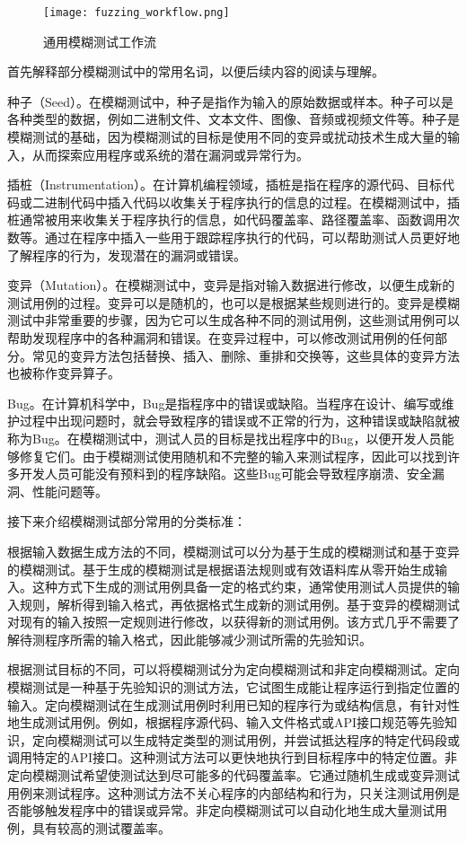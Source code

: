 \documentclass[master]{thesis-uestc}
\begin{document}
\begin{figure}[!htbp]
    \vspace{6pt}
    \centering
    \texttt{[image: fuzzing\_workflow.png]}
    \caption{通用模糊测试工作流}
    \label{fuzzing_workflow}
\end{figure}

首先解释部分模糊测试中的常用名词，以便后续内容的阅读与理解。

种子（Seed）。在模糊测试中，种子是指作为输入的原始数据或样本。种子可以是各种类型的数据，例如二进制文件、文本文件、图像、音频或视频文件等。种子是模糊测试的基础，因为模糊测试的目标是使用不同的变异或扰动技术生成大量的输入，从而探索应用程序或系统的潜在漏洞或异常行为。

插桩（Instrumentation）。在计算机编程领域，插桩是指在程序的源代码、目标代码或二进制代码中插入代码以收集关于程序执行的信息的过程。在模糊测试中，插桩通常被用来收集关于程序执行的信息，如代码覆盖率、路径覆盖率、函数调用次数等。通过在程序中插入一些用于跟踪程序执行的代码，可以帮助测试人员更好地了解程序的行为，发现潜在的漏洞或错误。

变异（Mutation）。在模糊测试中，变异是指对输入数据进行修改，以便生成新的测试用例的过程。变异可以是随机的，也可以是根据某些规则进行的。变异是模糊测试中非常重要的步骤，因为它可以生成各种不同的测试用例，这些测试用例可以帮助发现程序中的各种漏洞和错误。在变异过程中，可以修改测试用例的任何部分。常见的变异方法包括替换、插入、删除、重排和交换等，这些具体的变异方法也被称作变异算子。

Bug。在计算机科学中，Bug是指程序中的错误或缺陷。当程序在设计、编写或维护过程中出现问题时，就会导致程序的错误或不正常的行为，这种错误或缺陷就被称为Bug。在模糊测试中，测试人员的目标是找出程序中的Bug，以便开发人员能够修复它们。由于模糊测试使用随机和不完整的输入来测试程序，因此可以找到许多开发人员可能没有预料到的程序缺陷。这些Bug可能会导致程序崩溃、安全漏洞、性能问题等。

接下来介绍模糊测试部分常用的分类标准：

根据输入数据生成方法的不同，模糊测试可以分为基于生成的模糊测试和基于变异的模糊测试。基于生成的模糊测试是根据语法规则或有效语料库从零开始生成输入。这种方式下生成的测试用例具备一定的格式约束，通常使用测试人员提供的输入规则，解析得到输入格式，再依据格式生成新的测试用例。基于变异的模糊测试对现有的输入按照一定规则进行修改，以获得新的测试用例。该方式几乎不需要了解待测程序所需的输入格式，因此能够减少测试所需的先验知识。

根据测试目标的不同，可以将模糊测试分为定向模糊测试和非定向模糊测试。定向模糊测试是一种基于先验知识的测试方法，它试图生成能让程序运行到指定位置的输入。定向模糊测试在生成测试用例时利用已知的程序行为或结构信息，有针对性地生成测试用例。例如，根据程序源代码、输入文件格式或API接口规范等先验知识，定向模糊测试可以生成特定类型的测试用例，并尝试抵达程序的特定代码段或调用特定的API接口。这种测试方法可以更快地执行到目标程序中的特定位置。非定向模糊测试希望使测试达到尽可能多的代码覆盖率。它通过随机生成或变异测试用例来测试程序。这种测试方法不关心程序的内部结构和行为，只关注测试用例是否能够触发程序中的错误或异常。非定向模糊测试可以自动化地生成大量测试用例，具有较高的测试覆盖率。
\end{document}
